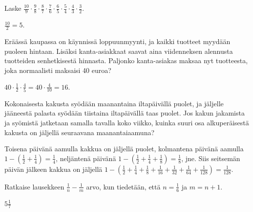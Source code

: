     \begin{tehtava}
        Laske 
        $\frac{10}{9}\cdot \frac{9}{8}\cdot \frac{8}{7}\cdot \frac{7}{6}\cdot \frac{6}{5}
            \cdot \frac{5}{4}\cdot \frac{4}{3}\cdot \frac{3}{2}$.
        
        \begin{vastaus}
            $\frac{10}{2}=5$.
        \end{vastaus}        
    \end{tehtava}
    
    \begin{tehtava}
    	Eräässä kaupassa on käynnissä loppuunmyynti, ja kaikki tuotteet
        myydään puoleen hintaan. Lisäksi kanta-asiakkaat saavat aina
        viidenneksen alennusta tuotteiden senhetkisestä hinnasta.
    	Paljonko kanta-asiakas maksaa nyt tuotteesta, joka normaalisti
        maksaisi 40 euroa?
    	\begin{vastaus}
    	$40\cdot \frac{1}{2} \cdot \frac{4}{5}=40\cdot \frac{4}{10}= 16$. 
    	\end{vastaus}
    \end{tehtava}
    
    \begin{tehtava}
        Kokonaisesta kakusta syödään maanantaina iltapäivällä puolet, ja jäljelle
        jääneestä palasta syödään tiistaina iltapäivällä taas puolet.
        Jos kakun jakamista ja syömistä jatketaan samalla tavalla koko viikko,
        kuinka suuri osa alkuperäisestä kakusta on
        jäljellä seuraavana maanantaiaamuna?
        
        \begin{vastaus}
            Toisena päivänä aamulla kakkua on jäljellä puolet, kolmantena
            päivänä aamulla
                $1-\left(\frac{1}{2} + \frac{1}{4}\right) = \frac{1}{4}$, 
            neljäntenä päivänä
                $1-\left(\frac{1}{2} + \frac{1}{4} + \frac{1}{8}\right)
                = \frac{1}{8}$, jne.
            Siis seitsemän päivän jälkeen kakkua on jäljellä
                $1-\left(\frac{1}{2} + \frac{1}{4} + \frac{1}{8} +
                \frac{1}{16} + \frac{1}{32} + \frac{1}{64} + \frac{1}{128}\right)
                = \frac{1}{128}$.  
        \end{vastaus}
    \end{tehtava}

    \begin{tehtava} %
Ratkaise lausekkeen $\frac{1}{n}-\frac{1}{m}$ arvo, kun tiedetään, että $n = \frac{1}{6}$ ja $m=n+1$.
        \begin{vastaus}
            $5 \frac{1}{7}$
        \end{vastaus}
    \end{tehtava}
